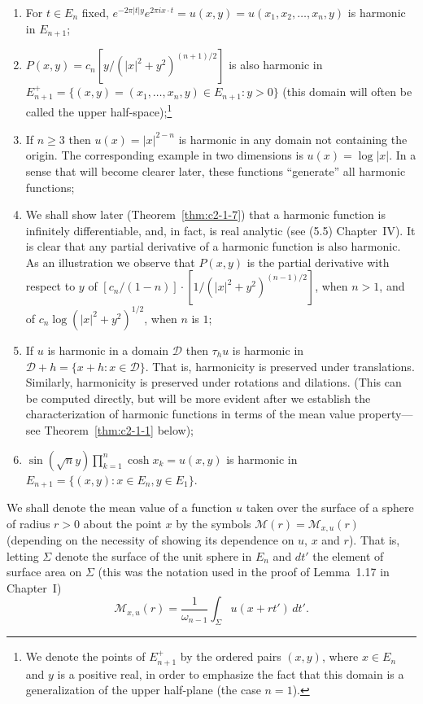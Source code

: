 \begin{enumerate}
\item[(1)] For $t \in E_n$ fixed, $e^{-2\pi|t|y} e^{2\pi i x \cdot t} = u(x, y) = u(x_1, x_2, \dots, x_n, y)$ is harmonic in $E_{n+1}$;
\item[(2)] $P(x, y) = c_n [y/(|x|^2 + y^2)^{(n+1)/2}]$ is also harmonic in $E_{n+1}^+ = \{(x, y) = (x_1, \dots, x_n, y) \in E_{n+1} : y > 0\}$ (this domain will often be called the upper half-space);\footnote{We denote the points of $E_{n+1}^+$ by the ordered pairs $(x, y)$, where $x \in E_n$ and $y$ is a positive real, in order to emphasize the fact that this domain is a generalization of the upper half-plane (the case $n = 1$).}
\item[(3)] If $n \geq 3$ then $u(x) = |x|^{2-n}$ is harmonic in any domain not containing the origin. The corresponding example in two dimensions is $u(x) = \log |x|$. In a sense that will become clearer later, these functions ``generate'' all harmonic functions;
\item[(4)] We shall show later (Theorem~\ref{thm:c2-1-7}) that a harmonic function is infinitely differentiable, and, in fact, is real analytic (see (5.5) Chapter~IV). It is clear that any partial derivative of a harmonic function is also harmonic. As an illustration we observe that $P(x, y)$ is the partial derivative with respect to $y$ of $[c_n/(1 - n)] \cdot [1/(|x|^2 + y^2)^{(n-1)/2}]$, when $n > 1$, and of $c_n \log(|x|^2 + y^2)^{1/2}$, when $n$ is $1$;
\item[(5)] If $u$ is harmonic in a domain $\mathcal{D}$ then $\tau_h u$ is harmonic in $\mathcal{D} + h = \{x + h : x \in \mathcal{D}\}$. That is, harmonicity is preserved under translations. Similarly, harmonicity is preserved under rotations and dilations. (This can be computed directly, but will be more evident after we establish the characterization of harmonic functions in terms of the mean value property---see Theorem~\ref{thm:c2-1-1} below);
\item[(6)] $\sin(\sqrt{n} y) \prod_{k=1}^{n} \cosh x_k = u(x, y)$ is harmonic in $E_{n+1} = \{(x, y) : x \in E_n, y \in E_1\}$.
\end{enumerate}

We shall denote the mean value of a function $u$ taken over the surface of a sphere of radius $r > 0$ about the point $x$ by the symbols $\mathcal{M}(r) = \mathcal{M}_{x,u}(r)$ (depending on the necessity of showing its dependence on $u$, $x$ and $r$). That is, letting $\Sigma$ denote the surface of the unit sphere in $E_n$ and $dt'$ the element of surface area on $\Sigma$ (this was the notation used in the proof of Lemma~1.17 in Chapter~I)
\[
\mathcal{M}_{x,u}(r) = \frac{1}{\omega_{n-1}} \int_{\Sigma} u(x + r t')\,dt'.
\]

